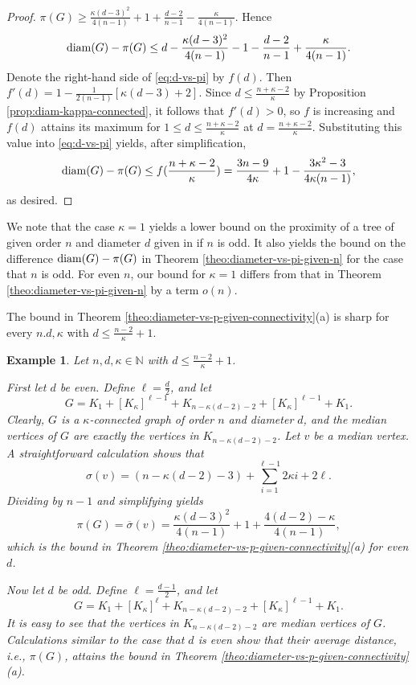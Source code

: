 \documentclass[a4paper,11pt]{article}
\newtheorem{example}{Example}[section]
\begin{document}
\begin{proof}
$\pi(G) \geq \frac{\kappa(d-3)^2}{4(n-1)} + 1 + \frac{d-2}{n-1}- \frac{\kappa}{4(n-1)}$. 
Hence
\begin{equation} \label{eq:d-vs-pi} 
{\rm diam}(G) - \pi(G) \leq d - \frac{\kappa(d-3)^2}{4(n-1)} - 1 - \frac{d-2}{n-1} + \frac{\kappa}{4(n-1)}. 
\end{equation}
Denote the right-hand side of \eqref{eq:d-vs-pi} by \( f(d) \). 
Then $f'(d)= 1 -  \frac{1}{2(n-1)}[\kappa(d-3)+2]$. Since $d \leq \frac{n+\kappa-2}{\kappa}$ by 
Proposition \ref{prop:diam-kappa-connected}, it follows that $f'(d) >0$, so $f$ is increasing and 
$f(d)$ attains its maximum for $1 \leq d \leq \frac{n+\kappa-2}{\kappa}$ at $d= \frac{n+\kappa-2}{\kappa}$.  
Substituting this value into \eqref{eq:d-vs-pi}  yields, after simplification, 
\[
{\rm diam}(G) - \pi(G)  \leq   f( \frac{n+\kappa-2}{\kappa}) 
   =   \frac{3n-9}{4\kappa } + 1  - \frac{3\kappa^2 - 3}{4\kappa(n-1)},
\]
as desired. 
\end{proof}

We note that the case $\kappa=1$ yields a lower bound on the proximity of a tree of 
given order $n$ and diameter $d$ given in \cite{PenZho2021} if $n$ is odd. 
It also yields the bound on the difference 
${\rm diam}(G) - \pi(G)$ in Theorem \ref{theo:diameter-vs-pi-given-n} for 
the case that $n$ is odd. 
For even $n$, our bound for $\kappa=1$ 
differs from that in Theorem \ref{theo:diameter-vs-pi-given-n} by a term $o(n)$. 

The bound in Theorem \ref{theo:diameter-vs-p-given-connectivity}(a) is sharp 
for  every $n.d,\kappa$ with $d \leq \frac{n-2}{\kappa}+1$. 

\begin{example}  \label{ex:diameter-pi-connectivity-1}
Let $n,d,\kappa \in \mathbb{N}$ with $d \leq \frac{n-2}{\kappa}+1$. 

First let $d$ be even. Define $\ell=\frac{d}{2}$, and let 
\[ G = K_1 + [K_{\kappa}]^{\ell-1} + K_{n - \kappa(d-2)-2} + [K_{\kappa}]^{\ell-1} + K_1. \]
Clearly, $G$ is a $\kappa$-connected graph of order $n$ and diameter $d$, and the median vertices 
of $G$ are exactly the vertices in $K_{n - \kappa(d-2)-2}$. Let $v$ be a median vertex.
A straightforward calculation shows that 
\[ \sigma(v) = (n - \kappa(d-2)-3) +  \sum_{i=1}^{\ell-1} 2\kappa i + 2\ell. \]
Dividing by $n-1$ and simplifying yields
\[ \pi(G) = \overline{\sigma}(v) = \frac{\kappa(d-3)^2}{4(n-1)} + 1 + \frac{4(d-2)-\kappa}{4(n-1)}, \]
which is the bound in Theorem \ref{theo:diameter-vs-p-given-connectivity}(a) for even $d$. 

Now let $d$ be odd. Define $\ell=\frac{d-1}{2}$, and let 
\[ G = K_1 + [K_{\kappa}]^{\ell} + K_{n - \kappa(d-2)-2} + [K_{\kappa}]^{\ell-1} + K_1. \]
It is easy to see that the vertices in $K_{n - \kappa(d-2)-2}$ are median vertices of $G$. 
Calculations similar to the case that $d$ is even show that their average distance,
i.e., $\pi(G)$, attains the bound in Theorem \ref{theo:diameter-vs-p-given-connectivity}(a).
\end{example}
\end{document}

